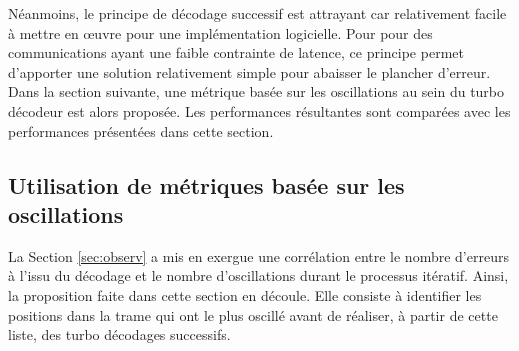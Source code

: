 Néanmoins, le principe de décodage successif est attrayant car relativement facile à mettre en œuvre pour une implémentation logicielle.
Pour pour des communications ayant une faible contrainte de latence, ce principe permet d'apporter une solution relativement
simple pour abaisser le plancher d'erreur. 
Dans la section suivante, une métrique basée sur les oscillations au sein du turbo décodeur est alors proposée. Les performances
résultantes sont comparées avec les performances présentées dans cette section.

\subsection{Utilisation de métriques basée sur les oscillations}
La Section \ref{sec:observ} a mis en exergue une corrélation entre le nombre d'erreurs à l'issu du décodage et 
le nombre d'oscillations durant le processus itératif. Ainsi, la proposition faite dans cette section en découle. Elle 
consiste à identifier les positions dans la trame qui ont le plus oscillé avant de réaliser, à partir de cette liste, des turbo décodages successifs.

